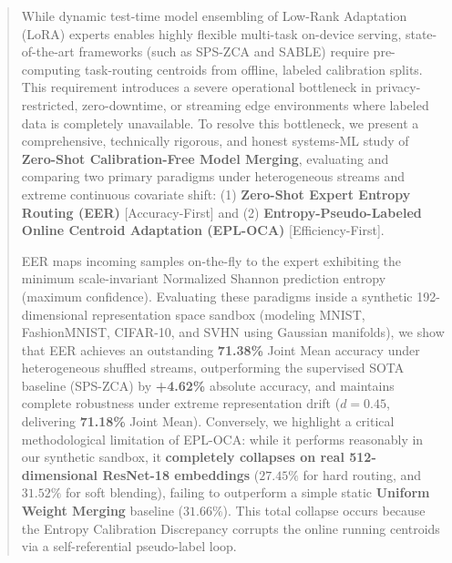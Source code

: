 \begin{abstract}
While dynamic test-time model ensembling of Low-Rank Adaptation (LoRA) experts enables highly flexible multi-task on-device serving, state-of-the-art frameworks (such as SPS-ZCA and SABLE) require pre-computing task-routing centroids from offline, labeled calibration splits. This requirement introduces a severe operational bottleneck in privacy-restricted, zero-downtime, or streaming edge environments where labeled data is completely unavailable. To resolve this bottleneck, we present a comprehensive, technically rigorous, and honest systems-ML study of \textbf{Zero-Shot Calibration-Free Model Merging}, evaluating and comparing two primary paradigms under heterogeneous streams and extreme continuous covariate shift: (1) \textbf{Zero-Shot Expert Entropy Routing (EER)} [Accuracy-First] and (2) \textbf{Entropy-Pseudo-Labeled Online Centroid Adaptation (EPL-OCA)} [Efficiency-First].

EER maps incoming samples on-the-fly to the expert exhibiting the minimum scale-invariant Normalized Shannon prediction entropy (maximum confidence). Evaluating these paradigms inside a synthetic 192-dimensional representation space sandbox (modeling MNIST, FashionMNIST, CIFAR-10, and SVHN using Gaussian manifolds), we show that EER achieves an outstanding \textbf{71.38\%} Joint Mean accuracy under heterogeneous shuffled streams, outperforming the supervised SOTA baseline (SPS-ZCA) by \textbf{+4.62\%} absolute accuracy, and maintains complete robustness under extreme representation drift ($d=0.45$, delivering \textbf{71.18\%} Joint Mean). Conversely, we highlight a critical methodological limitation of EPL-OCA: while it performs reasonably in our synthetic sandbox, it \textbf{completely collapses on real 512-dimensional ResNet-18 embeddings} ($27.45\%$ for hard routing, and $31.52\%$ for soft blending), failing to outperform a simple static \textbf{Uniform Weight Merging} baseline ($31.66\%$). This total collapse occurs because the Entropy Calibration Discrepancy corrupts the online running centroids via a self-referential pseudo-label loop.


\end{abstract}
